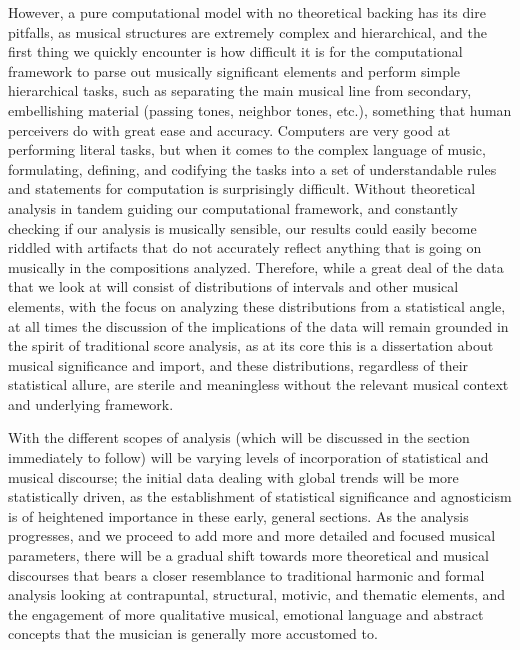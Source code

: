 However, a pure computational model with no theoretical backing has its
dire pitfalls, as musical structures are extremely complex and
hierarchical, and the first thing we quickly encounter is how difficult
it is for the computational framework to parse out musically significant
elements and perform simple hierarchical tasks, such as separating the
main musical line from secondary, embellishing material (passing tones,
neighbor tones, etc.), something that human perceivers do with great
ease and accuracy. Computers are very good at performing literal tasks,
but when it comes to the complex language of music, formulating,
defining, and codifying the tasks into a set of understandable rules and
statements for computation is surprisingly difficult. Without
theoretical analysis in tandem guiding our computational framework, and
constantly checking if our analysis is musically sensible, our results
could easily become riddled with artifacts that do not accurately
reflect anything that is going on musically in the compositions
analyzed. Therefore, while a great deal of the data that we look at will
consist of distributions of intervals and other musical elements, with
the focus on analyzing these distributions from a statistical angle, at
all times the discussion of the implications of the data will remain
grounded in the spirit of traditional score analysis, as at its core
this is a dissertation about musical significance and import, and these
distributions, regardless of their statistical allure, are sterile and
meaningless without the relevant musical context and underlying
framework.

With the different scopes of analysis (which will be discussed in the
section immediately to follow) will be varying levels of incorporation
of statistical and musical discourse; the initial data dealing with
global trends will be more statistically driven, as the establishment of
statistical significance and agnosticism is of heightened importance in
these early, general sections. As the analysis progresses, and we
proceed to add more and more detailed and focused musical parameters,
there will be a gradual shift towards more theoretical and musical
discourses that bears a closer resemblance to traditional harmonic and
formal analysis looking at contrapuntal, structural, motivic, and
thematic elements, and the engagement of more qualitative musical,
emotional language and abstract concepts that the musician is generally
more accustomed to.

